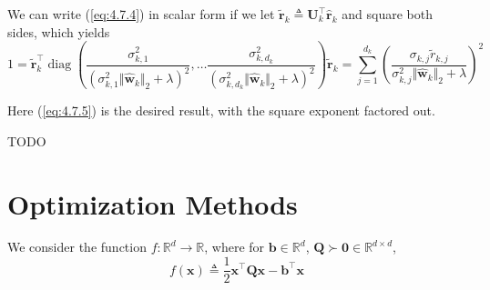 \documentclass{article}
\numberwithin{equation}{section}
\begin{document}
We can write (\ref{eq:4.7.4}) in scalar form if we let
$ \tilde{\mathbf{r}}_k \triangleq \mathbf{U}_k^\top\hat{\mathbf{r}}_k $ and
square both sides, which yields
\begin{equation} \label{eq:4.7.5}
    1 =
    \tilde{\mathbf{r}}_k^\top
    \operatorname{diag}
    \left(
        \frac{
            \sigma_{k, 1}^2
        }{
            (\sigma_{k, 1}^2\Vert\hat{\mathbf{w}}_k\Vert_2 + \lambda)^2
        },
        \ldots \frac{
            \sigma_{k, d_k}^2
        }{
            (\sigma_{k, d_k}^2\Vert\hat{\mathbf{w}}_k\Vert_2 + \lambda)^2
        }
    \right)
    \tilde{\mathbf{r}}_k =
    \sum_{j = 1}^{d_k}
    \left(
        \frac{
            \sigma_{k, j}\tilde{r}_{k, j}
        }{
            \sigma_{k, j}^2\Vert\hat{\mathbf{w}}_k\Vert_2 + \lambda
        }
    \right)^2
\end{equation}

Here (\ref{eq:4.7.5}) is the desired result, with the square exponent factored
out.

TODO

\section{Optimization Methods}


We consider the function $ f : \mathbb{R}^d \rightarrow \mathbb{R} $, where
for $ \mathbf{b} \in \mathbb{R}^d $, $ \mathbf{Q} \succ \mathbf{0} \in
\mathbb{R}^{d \times d} $,
\begin{equation} \label{eq:5.1.1}
    f(\mathbf{x}) \triangleq
    \frac{1}{2}\mathbf{x}^\top\mathbf{Qx} - \mathbf{b}^\top\mathbf{x}
\end{equation}
\end{document}
